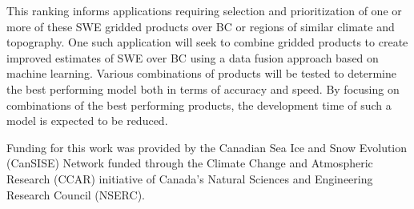 \documentclass[12pt]{article}
\begin{document}
This ranking informs applications requiring selection and prioritization of one or more of these SWE gridded products over BC or regions of similar climate and topography.  One such application will seek to combine gridded products to create improved estimates of SWE over BC using a data fusion approach based on machine learning.  Various combinations of products will be tested to determine the best performing model both in terms of accuracy and speed.  By focusing on combinations of the best performing products, the development time of such a model is expected to be reduced.


Funding for this work was provided by the Canadian Sea Ice and Snow Evolution (CanSISE) Network funded through the Climate Change and Atmospheric Research (CCAR) initiative of Canada's Natural Sciences and Engineering Research Council (NSERC).  
\citep{walter2005process}




\end{document}
